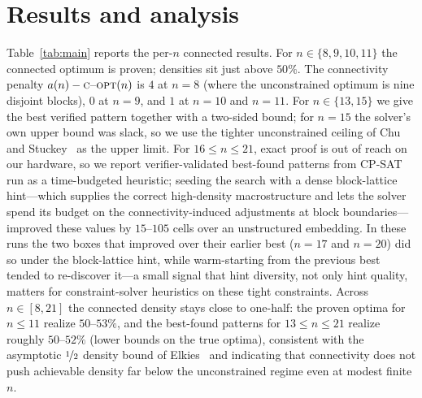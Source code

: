 \documentclass{article}
\newcommand{\copt}{\textsc{c\textendash opt}}
\begin{document}
\section{Results and analysis}
\label{sec:results}

Table~\ref{tab:main} reports the per-$n$ connected results. For $n\in\{8,9,10,11\}$ the connected optimum is proven; densities sit just above $50\%$. The connectivity penalty $a(n)-\copt(n)$ is $4$ at $n=8$ (where the unconstrained optimum is nine disjoint blocks), $0$ at $n=9$, and $1$ at $n=10$ and $n=11$. For $n\in\{13,15\}$ we give the best verified pattern together with a two-sided bound; for $n=15$ the solver's own upper bound was slack, so we use the tighter unconstrained ceiling of Chu and Stuckey~\citep{chu2012} as the upper limit. For $16\le n\le 21$, exact proof is out of reach on our hardware, so we report verifier-validated best-found patterns from CP-SAT run as a time-budgeted heuristic; seeding the search with a dense block-lattice hint---which supplies the correct high-density macrostructure and lets the solver spend its budget on the connectivity-induced adjustments at block boundaries---improved these values by $15$--$105$ cells over an unstructured embedding. In these runs the two boxes that improved over their earlier best ($n=17$ and $n=20$) did so under the block-lattice hint, while warm-starting from the previous best tended to re-discover it---a small signal that hint diversity, not only hint quality, matters for constraint-solver heuristics on these tight constraints. Across $n\in[8,21]$ the connected density stays close to one-half: the proven optima for $n\le 11$ realize $50$--$53\%$, and the best-found patterns for $13\le n\le 21$ realize roughly $50$--$52\%$ (lower bounds on the true optima), consistent with the asymptotic $\nicefrac{1}{2}$ density bound of Elkies~\citep{elkies1998} and indicating that connectivity does not push achievable density far below the unconstrained regime even at modest finite $n$.
\end{document}
